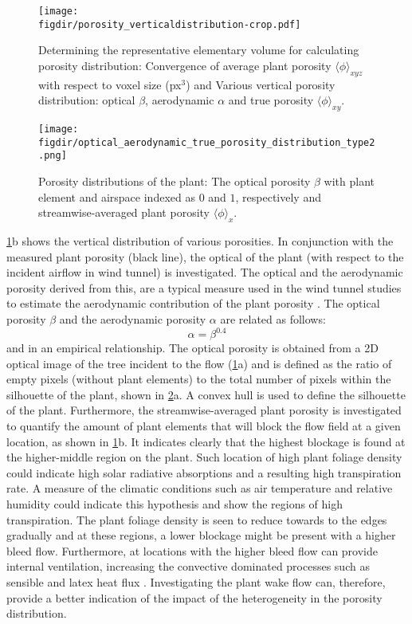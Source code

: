 	\begin{figure}[p]
		\centering
		\texttt{[image: \\figdir/porosity\_verticaldistribution-crop.pdf]}
		\caption{Determining the representative elementary volume for calculating porosity distribution:  Convergence of average plant porosity $\langle \phi \rangle_{xyz}$ with respect to voxel size (px$^3$) and  Various vertical porosity distribution: optical $\beta$, aerodynamic $\alpha$ and true porosity $\langle \phi \rangle_{xy}$.}
		\label{fig:porositydistribution}
	\end{figure}

	\begin{figure}[p]
		\centering
		\texttt{[image: \\figdir/optical\_aerodynamic\_true\_porosity\_distribution\_type2.png]}
		\caption{Porosity distributions of the plant:  The optical porosity $\beta$ with plant element and airspace indexed as $0$ and $1$, respectively and  streamwise-averaged plant porosity $\langle \phi \rangle_x$. }
		\label{fig:porosities}
	\end{figure}

\cref{fig:porositydistribution}b shows the vertical distribution of various porosities. In conjunction with the measured plant porosity (black line), the optical of the plant (with respect to the incident airflow in wind tunnel) is investigated. The optical and the aerodynamic porosity derived from this, are a typical measure used in the wind tunnel studies to estimate the aerodynamic contribution of the plant porosity \citep{Grant1998, Guan2003, Manickathan2018b}. The optical porosity $\beta$ and the aerodynamic porosity $\alpha$ are related as follows:
\begin{equation}
\alpha = \beta^{0.4}
\end{equation}
and in an empirical relationship. The optical porosity is obtained from a 2D optical image of the tree incident to the flow (\cref{fig:porositydistribution}a) and is defined as the ratio of empty pixels (without plant elements) to the total number of pixels within the silhouette of the plant, shown in  \cref{fig:porosities}a. A convex hull is used to define the silhouette of the plant. Furthermore, the streamwise-averaged plant porosity is investigated to quantify the amount of plant elements that will block the flow field at a given location, as shown in \cref{fig:porositydistribution}b. It indicates clearly that the highest blockage is found at the higher-middle region on the plant. Such location of high plant foliage density could indicate high solar radiative absorptions and a resulting high transpiration rate. A measure of the climatic conditions such as air temperature and relative humidity could indicate this hypothesis and show the regions of high transpiration. The plant foliage density is seen to reduce towards to the edges gradually and at these regions, a lower blockage might be present with a higher bleed flow. Furthermore, at locations with the higher bleed flow can provide internal ventilation, increasing the convective dominated processes such as sensible and latex heat flux \citep{Manickathan2018a}. Investigating the plant wake flow can, therefore, provide a better indication of the impact of the heterogeneity in the porosity distribution.

